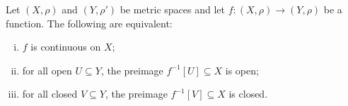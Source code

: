 \begin{lemma}
	Let $(X, \rho)$ and $(Y, \rho')$ be metric spaces and let $f: (X, \rho) \to (Y, \rho)$ be a function. The following are equivalent:
	\begin{enumerate}[(i)]
		\item $f$ is continuous on $X$;
		\item for all open $U \subseteq Y$, the preimage $f^{-1}[U] \subseteq X$ is open;
		\item for all closed $V \subseteq Y$, the preimage $f^{-1}[V] \subseteq X$ is closed.
	\end{enumerate}
\end{lemma}
































%